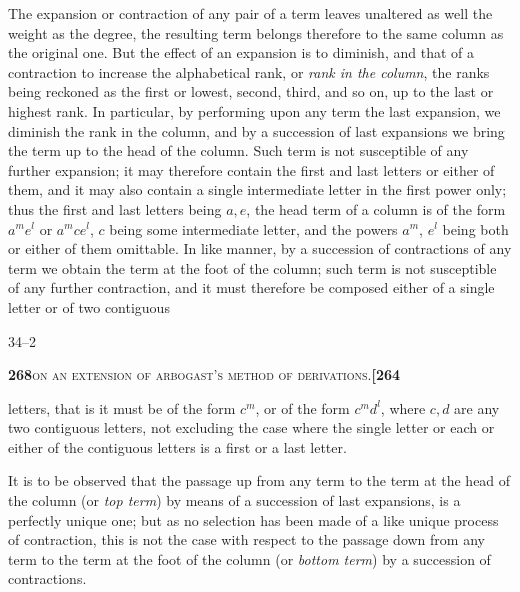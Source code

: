 \documentclass[11pt]{article}
\begin{document}
\medskip

\noindent The expansion or contraction of any pair of a term leaves unaltered as well the weight as the degree, the resulting term belongs therefore to the same column as the original one. But the effect of an expansion is to diminish, and that of a contraction to increase the alphabetical rank, or \textit{rank in the column}, the ranks being reckoned as the first or lowest, second, third, and so on, up to the last or highest rank. In particular, by performing upon any term the last expansion, we diminish the rank in the column, and by a succession of last expansions we bring the term up to the head of the column. Such term is not susceptible of any further expansion; it may therefore contain the first and last letters or either of them, and it may also contain a single intermediate letter in the first power only; thus the first and last letters being $a, e$, the head term of a column is of the form $a^m e^l$ or $a^m c e^l$, $c$ being some intermediate letter, and the powers $a^m$, $e^l$ being both or either of them omittable. In like manner, by a succession of contractions of any term we obtain the term at the foot of the column; such term is not susceptible of any further contraction, and it must therefore be composed either of a single letter or of two contiguous

\medskip

\noindent\hfill 34--2

\newpage
\setcounter{page}{268}

\noindent\textbf{268}\hfill\textsc{on an extension of arbogast's method of derivations.}\hfill\textbf{[264}

\medskip

\noindent letters, that is it must be of the form $c^m$, or of the form $c^m d^l$, where $c, d$ are any two contiguous letters, not excluding the case where the single letter or each or either of the contiguous letters is a first or a last letter.

\medskip

\noindent It is to be observed that the passage up from any term to the term at the head of the column (or \textit{top term}) by means of a succession of last expansions, is a perfectly unique one; but as no selection has been made of a like unique process of contraction, this is not the case with respect to the passage down from any term to the term at the foot of the column (or \textit{bottom term}) by a succession of contractions.

\medskip
\end{document}
